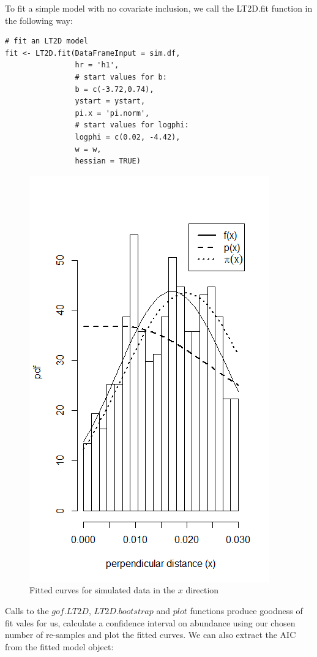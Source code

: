 \documentclass[11pt]{article}
\begin{document}
\begin{multicols}{2}
To fit a simple model with no covariate inclusion, we call the LT2D.fit function in the following way:

\begingroup
\small
\begin{lstlisting}
# fit an LT2D model
fit <- LT2D.fit(DataFrameInput = sim.df,
                hr = 'h1',
                # start values for b:
                b = c(-3.72,0.74),
                ystart = ystart,
                pi.x = 'pi.norm',
                # start values for logphi:
                logphi = c(0.02, -4.42),
                w = w,
                hessian = TRUE)
\end{lstlisting}
\endgroup

\begin{figure}[H]
\center
\includegraphics[scale=0.85]{fig7}
\caption{Fitted curves for simulated data in the $x$ direction}
\end{figure}


Calls to the $gof.LT2D$, $LT2D.bootstrap$ and $plot$ functions produce goodness of fit vales for us, calculate a confidence interval on abundance using our chosen number of re-samples and plot the fitted curves. We can also extract the AIC from the fitted model object:


\end{multicols}
\end{document}
